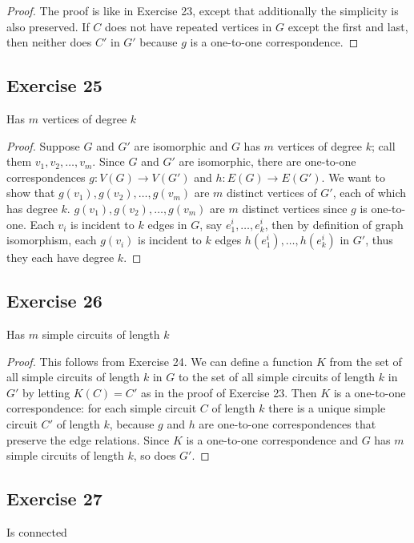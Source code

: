 \documentclass[14pt]{extarticle}
\begin{document}
\begin{proof}
    The proof is like in Exercise 23, except that additionally the simplicity is also preserved. If \(C\) does not have repeated
    vertices in \(G\) except the first and last, then neither does \(C'\) in \(G'\) because \(g\) is a one-to-one correspondence.
\end{proof}

\subsection{Exercise 25}
Has \(m\) vertices of degree \(k\)

\begin{proof}
    Suppose \(G\) and \(G'\) are isomorphic and \(G\) has \(m\) vertices of degree \(k\); call them \(v_1, v_2, \ldots, v_m\).
    Since \(G\) and \(G'\) are isomorphic, there are one-to-one correspondences \(g: V(G)\to V(G')\) and \(h: E(G)\to E(G')\).
    We want to show that \(g(v_1), g(v_2), \ldots, g(v_m)\) are \(m\) distinct vertices of \(G'\), each of which has degree
    \(k\). \(g(v_1), g(v_2), \ldots, g(v_m)\) are \(m\) distinct vertices since \(g\) is one-to-one. Each \(v_i\) is incident
    to \(k\) edges in \(G\), say \(e_1^i, \ldots, e_k^i\), then by definition of graph isomorphism, each \(g(v_i)\) is incident
    to \(k\) edges \(h(e_1^i), \ldots, h(e_k^i)\) in \(G'\), thus they each have degree \(k\).
\end{proof}

\subsection{Exercise 26}
Has \(m\) simple circuits of length \(k\)

\begin{proof}
    This follows from Exercise 24. We can define a function \(K\) from the set of all simple circuits of length \(k\) in \(G\)
    to the set of all simple circuits of length \(k\) in \(G'\) by letting \(K(C) = C'\) as in the proof of Exercise 23. Then
    \(K\) is a one-to-one correspondence: for each simple circuit \(C\) of length \(k\) there is a unique simple circuit \(C'\)
    of length \(k\), because \(g\) and \(h\) are one-to-one correspondences that preserve the edge relations. Since \(K\)
    is a one-to-one correspondence and \(G\) has \(m\) simple circuits of length \(k\), so does \(G'\).
\end{proof}

\subsection{Exercise 27}
Is connected
\end{document}
